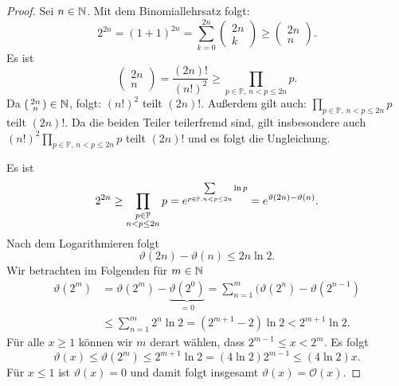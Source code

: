\documentclass{mywork}
\renewcommand{\theta}{\vartheta}
\begin{document}
\begin{proof}
Sei $ n\in \mathbb{N} $. Mit dem Binomiallehrsatz folgt:
\[
2^{2n} = (1+1)^{2n}=\sum_{k=0}^{2n} \begin{pmatrix} 2n \\ k \end{pmatrix} \ge \begin{pmatrix} 2n \\ n \end{pmatrix}.
\]
Es ist 
\[
\begin{pmatrix}2n \\ n \end{pmatrix} = \frac{(2n)!}{(n!)^2}\ge \prod_{p \in \mathbb P, \, n<p\le 2n} p.
\]
Da $ \begin{psmallmatrix} 2n \\ n \end{psmallmatrix} \in \mathbb{N} $, folgt: $ (n!)^2$ teilt $ (2n)! $. Außerdem gilt auch: $ \prod_{p \in \mathbb P, \, n<p\le 2n} p$ teilt $(2n)!$. Da die beiden Teiler teilerfremd sind, gilt insbesondere auch $ (n!)^2 \prod_{p \in \mathbb P, \, n<p\le 2n} p$ teilt $(2n)! $ und es folgt die Ungleichung.

Es ist
\[
2^{2n}\ge \prod_{\substack{p\in \P \\ n<p\le 2n}} p =e^{\sum\limits_{p\in \P, n< p \le 2n} \ln p}=e^{\theta(2n)-\theta(n)}.
\]
Nach dem Logarithmieren folgt
\[
\theta(2n)-\theta(n)\le 2n \ln 2.
\]
Wir betrachten im Folgenden für $ m\in \mathbb{N} $
\begin{align*}
\theta(2^m)&=\theta(2^m)-\underbrace{\theta(2^0)}_{=0}=\sum_{n=1}^m (\theta(2^n)-\theta(2^{n-1}) \\ 
&\le \sum_{n=1}^m 2^n \ln 2 = (2^{m+1}-2)\ln 2< 2^{m+1} \ln 2.
\end{align*}
Für alle $ x\ge 1 $ können wir $m$ derart wählen, dass $ 2^{m-1} \le x < 2^m $. Es folgt
\[
\theta(x) \le \theta(2^m) \le 2^{m+1}\ln 2 = (4 \ln 2)2^{m-1} \le (4 \ln 2) x.
\]
Für $ x\le 1 $ ist $ \theta(x)=0 $ und damit folgt insgesamt $ \theta(x)=\mathcal O(x) $.
\end{proof}
\end{document}
